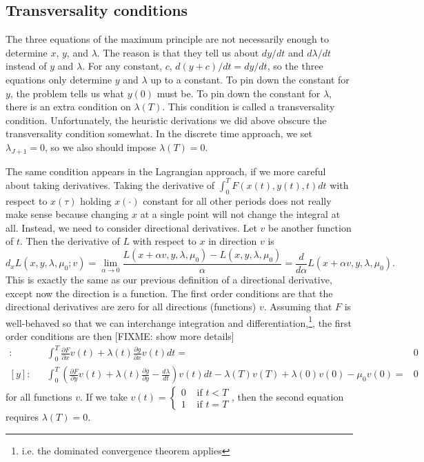 \subsection{Transversality conditions}

The three equations of the maximum principle are not necessarily
enough to determine $x$, $y$, and $\lambda$. The reason is that they
tell us about $dy/dt$ and $d\lambda/dt$ instead of $y$ and
$\lambda$. For any constant, $c$, $d(y+c)/dt = dy/dt$, so the three
equations only determine $y$ and $\lambda$ up to a constant. To pin
down the constant for $y$, the problem tells us what $y(0)$ must
be. To pin down the constant for $\lambda$, there is an extra
condition on $\lambda(T)$. This condition is called a transversality
condition. Unfortunately, the heuristic derivations we did above
obscure the transversality condition somewhat. In the discrete time
approach, we set $\lambda_{J+1} =0$, so we also should impose
$\lambda(T) = 0$. 

The same condition appears in the Lagrangian approach, if we more
careful about taking derivatives. Taking the derivative of $\int_0^T
F(x(t),y(t),t) dt$ with respect to $x(\tau)$ holding $x(\cdot)$
constant for all other periods does not really make sense because
changing $x$ at a single point will not change the integral at
all. Instead, we need to consider directional derivatives. Let $v$ be
another function of $t$. Then the derivative of $L$ with respect to
$x$ in direction $v$ is
\[ d_xL(x,y,\lambda,\mu_0;v) = \lim_{\alpha \to 0} \frac{L(x + \alpha
  v, y, \lambda, \mu_0) - L(x,y,\lambda,\mu_0)}{\alpha} =
\frac{d}{d\alpha} L(x+\alpha v, y, \lambda, \mu_0). \]
This is exactly the same as our previous definition of a directional
derivative, except now the direction is a function. The first order
conditions are that the directional derivatives are zero for all
directions (functions) $v$. Assuming that $F$ is well-behaved so that
we can interchange integration and differentiation,\footnote{i.e. the
  dominated convergence theorem applies}, the first order conditions
are then [FIXME: show more details]
\begin{align*}
  [x]: && \int_0^T \frac{\partial F}{\partial x}v(t) + \lambda(t) \frac{\partial
    g}{\partial x}v(t) dt = &  0 \\
  [y]: && \int_0^T \left(\frac{\partial F}{\partial y}v(t) + \lambda(t) \frac{\partial
      g}{\partial y}-\frac{d\lambda}{dt} \right)v(t) dt - \lambda(T) 
  v(T) + \lambda(0) v(0) - \mu_0 v(0)= & 0
\end{align*}
for all functions $v$. If we take $v(t) = \begin{cases} 0 & \text{ if
  }t<T\\
1 & \text{ if } t=T \end{cases}$, then the second equation requires
$\lambda(T)=0$. 

